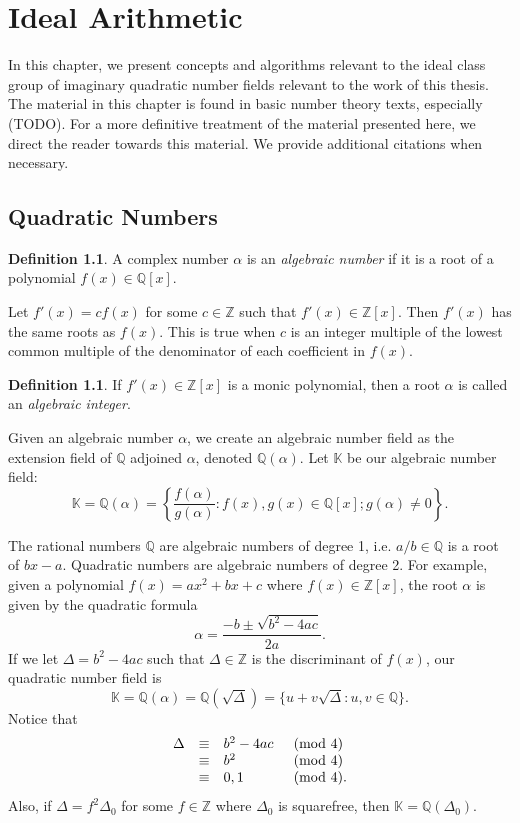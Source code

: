 \documentclass{ucalgthes1}
\theoremstyle{plain}
\theoremstyle{definition}
\newtheorem{defn}[thm]{Definition}
\newcommand{\KK}{\mathbb{K}}
\newcommand{\ZZ}{\mathbb{Z}}
\newcommand{\QQ}{\mathbb{Q}}
\begin{document}
\setcounter{chapter}{1}
\chapter{Ideal Arithmetic}

In this chapter, we present concepts and algorithms relevant to the ideal class group of imaginary quadratic number fields relevant to the work of this thesis.  The material in this chapter is found in basic number theory texts, especially (TODO).  For a more definitive treatment of the material presented here, we direct the reader towards this material.  We provide additional citations when necessary.  

\section{Quadratic Numbers}

\begin{defn}
A complex number $\alpha$ is an \emph{algebraic number} if it is a root of a polynomial $f(x) \in \QQ[x]$.
\end{defn}
Let $f'(x) = cf(x)$ for some $c \in \ZZ$ such that $f'(x) \in \ZZ[x]$.  Then $f'(x)$ has the same roots as $f(x)$.  This is true when $c$ is an integer multiple of the lowest common multiple of the denominator of each coefficient in $f(x)$.
\begin{defn}
If $f'(x) \in \ZZ[x]$ is a monic polynomial, then a root $\alpha$ is called an \emph{algebraic integer}. 
\end{defn}
Given an algebraic number $\alpha$, we create an algebraic number field as the extension field of $\QQ$ adjoined $\alpha$, denoted $\QQ(\alpha)$. Let $\KK$ be our algebraic number field:
\[
	\KK = \QQ(\alpha) = \left\{ \frac{f(\alpha)}{g(\alpha)} : f(x), g(x) \in \QQ[x]; g(\alpha) \ne 0 \right\}.
\]

\bigbreak
The rational numbers $\QQ$ are algebraic numbers of degree 1, i.e. $a/b \in \QQ$ is a root of $bx - a$.  Quadratic numbers are algebraic numbers of degree 2.  For example, given a polynomial $f(x) = ax^2 + bx + c$ where $f(x) \in \ZZ[x]$, the root $\alpha$ is given by the quadratic formula
\[
	\alpha = \frac{-b \pm \sqrt{b^2 - 4ac}}{2a}.
\]
If we let $\Delta = b^2 -4ac$ such that $\Delta \in \ZZ$ is the discriminant of $f(x)$, our quadratic number field is 
\[
	\KK = \QQ(\alpha) = \QQ(\sqrt{\Delta}) = \{u + v\sqrt{\Delta} : u,v \in \QQ\}.
\]
Notice that
\begin{eqnarray*}
\begin{array}{l l l l}
	\Delta & \equiv & b^2-4ac & \pmod 4 \\
	& \equiv & b^2 & \pmod 4 \\
	& \equiv & 0,1 & \pmod 4.
\end{array}
\end{eqnarray*}
Also, if $\Delta = f^2 \Delta_0$ for some $f \in \ZZ$ where $\Delta_0$ is squarefree, then $\KK = \QQ(\Delta_0)$.
\end{document}
